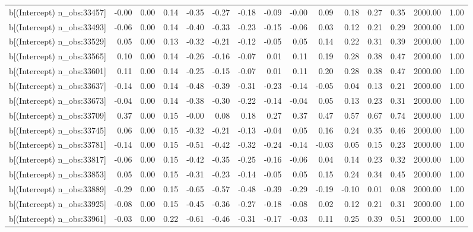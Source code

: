 \begin{table}[ht]
\begin{tabular}{rrrrrrrrrrrrrrr}
  b[(Intercept) n\_obs:33457] & -0.00 & 0.00 & 0.14 & -0.35 & -0.27 & -0.18 & -0.09 & -0.00 & 0.09 & 0.18 & 0.27 & 0.35 & 2000.00 & 1.00 \\ 
  b[(Intercept) n\_obs:33493] & -0.06 & 0.00 & 0.14 & -0.40 & -0.33 & -0.23 & -0.15 & -0.06 & 0.03 & 0.12 & 0.21 & 0.29 & 2000.00 & 1.00 \\ 
  b[(Intercept) n\_obs:33529] & 0.05 & 0.00 & 0.13 & -0.32 & -0.21 & -0.12 & -0.05 & 0.05 & 0.14 & 0.22 & 0.31 & 0.39 & 2000.00 & 1.00 \\ 
  b[(Intercept) n\_obs:33565] & 0.10 & 0.00 & 0.14 & -0.26 & -0.16 & -0.07 & 0.01 & 0.11 & 0.19 & 0.28 & 0.38 & 0.47 & 2000.00 & 1.00 \\ 
  b[(Intercept) n\_obs:33601] & 0.11 & 0.00 & 0.14 & -0.25 & -0.15 & -0.07 & 0.01 & 0.11 & 0.20 & 0.28 & 0.38 & 0.47 & 2000.00 & 1.00 \\ 
  b[(Intercept) n\_obs:33637] & -0.14 & 0.00 & 0.14 & -0.48 & -0.39 & -0.31 & -0.23 & -0.14 & -0.05 & 0.04 & 0.13 & 0.21 & 2000.00 & 1.00 \\ 
  b[(Intercept) n\_obs:33673] & -0.04 & 0.00 & 0.14 & -0.38 & -0.30 & -0.22 & -0.14 & -0.04 & 0.05 & 0.13 & 0.23 & 0.31 & 2000.00 & 1.00 \\ 
  b[(Intercept) n\_obs:33709] & 0.37 & 0.00 & 0.15 & -0.00 & 0.08 & 0.18 & 0.27 & 0.37 & 0.47 & 0.57 & 0.67 & 0.74 & 2000.00 & 1.00 \\ 
  b[(Intercept) n\_obs:33745] & 0.06 & 0.00 & 0.15 & -0.32 & -0.21 & -0.13 & -0.04 & 0.05 & 0.16 & 0.24 & 0.35 & 0.46 & 2000.00 & 1.00 \\ 
  b[(Intercept) n\_obs:33781] & -0.14 & 0.00 & 0.15 & -0.51 & -0.42 & -0.32 & -0.24 & -0.14 & -0.03 & 0.05 & 0.15 & 0.23 & 2000.00 & 1.00 \\ 
  b[(Intercept) n\_obs:33817] & -0.06 & 0.00 & 0.15 & -0.42 & -0.35 & -0.25 & -0.16 & -0.06 & 0.04 & 0.14 & 0.23 & 0.32 & 2000.00 & 1.00 \\ 
  b[(Intercept) n\_obs:33853] & 0.05 & 0.00 & 0.15 & -0.31 & -0.23 & -0.14 & -0.05 & 0.05 & 0.15 & 0.24 & 0.34 & 0.45 & 2000.00 & 1.00 \\ 
  b[(Intercept) n\_obs:33889] & -0.29 & 0.00 & 0.15 & -0.65 & -0.57 & -0.48 & -0.39 & -0.29 & -0.19 & -0.10 & 0.01 & 0.08 & 2000.00 & 1.00 \\ 
  b[(Intercept) n\_obs:33925] & -0.08 & 0.00 & 0.15 & -0.45 & -0.36 & -0.27 & -0.18 & -0.08 & 0.02 & 0.12 & 0.21 & 0.31 & 2000.00 & 1.00 \\ 
  b[(Intercept) n\_obs:33961] & -0.03 & 0.00 & 0.22 & -0.61 & -0.46 & -0.31 & -0.17 & -0.03 & 0.11 & 0.25 & 0.39 & 0.51 & 2000.00 & 1.00 \\ 

\end{tabular}
\end{table}
